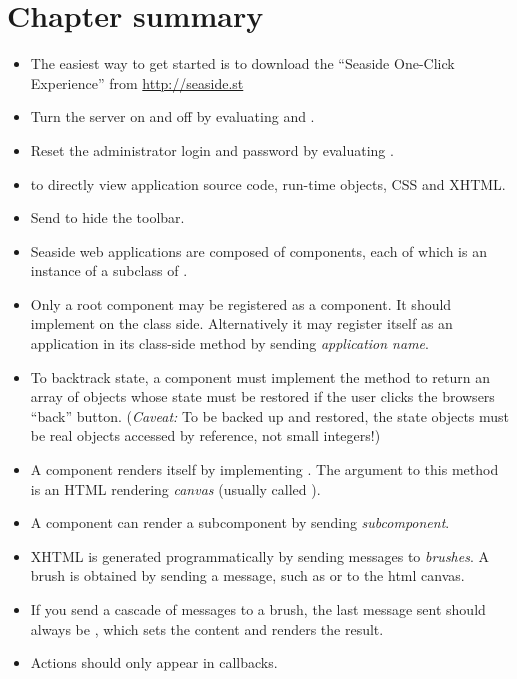 \documentclass[a4paper,10pt,twoside]{book}
\begin{document}
\section{Chapter summary}

\begin{itemize}
  \item The easiest way to get started is to download the ``Seaside One-Click Experience'' from \url{http://seaside.st}
  \item Turn the server on and off by evaluating  and .
  \item Reset the administrator login and password by evaluating .
  \item {} to directly view application source code, run-time objects, CSS and XHTML.
  \item Send  to hide the toolbar.
  \item Seaside web applications are composed of components, each of which is an instance of a subclass of .
  \item Only a root component may be registered as a component. It should implement  on the class side. Alternatively it may register itself as an application in its class-side  method by sending  \emph{application name}.
  \item To backtrack state, a component must implement the  method to return an array of objects whose state must be restored if the user clicks the browsers ``back'' button. (\emph{Caveat:}  To be backed up and restored, the state objects must be real objects accessed by reference, not small integers!)
  \item A component renders itself by implementing .
  The argument to this method is an HTML rendering \emph{canvas} (usually called ).
  \item A component can render a subcomponent by sending  \emph{subcomponent}.
  \item XHTML is generated programmatically by sending messages to \emph{brushes}. A brush is obtained by sending a message, such as  or  to the html canvas.
  \item If you send a cascade of messages to a brush, the last message sent should always be , which sets the content and renders the result.
  \item Actions should only appear in callbacks.

\end{itemize}
\end{document}
